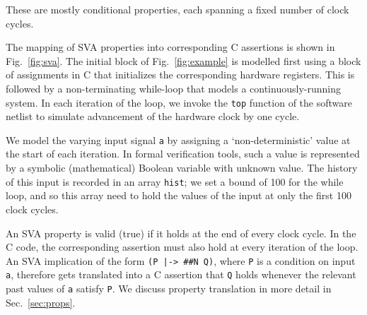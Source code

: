 \noindent These are mostly conditional properties, each spanning a fixed number of clock cycles. 
 
The mapping of SVA properties into corresponding C assertions is shown in Fig.\ \ref{fig:sva}. The initial block of Fig.\ \ref{fig:example} is modelled first using a block of assignments in C that initializes the corresponding hardware registers.  This is followed by a non-terminating while-loop that models a continuously-running system. In each iteration of the loop, we invoke the \texttt{top} function of the software netlist to simulate advancement of the hardware clock by one cycle. 

We model the varying input signal \texttt{a} by assigning a `non-deterministic' value at the start of each iteration. In formal verification tools, such a value is represented by a symbolic (mathematical) Boolean variable with unknown value. The history of this input is recorded in an array \texttt{hist}; we set a bound of 100 for the while loop, and so this array need to hold the values of the input at only the first 100 clock cycles.

An SVA property is valid (true) if it holds at the end of every clock cycle. In the C code, the corresponding assertion must also hold at every iteration of the loop. An SVA implication of the form \texttt{(P |-> \#\#N Q)}, where \texttt{P} is a condition on input \texttt{a}, therefore gets translated into a C assertion that \texttt{Q} holds whenever the relevant past values of \texttt{a} satisfy \texttt{P}. We discuss property translation in more detail in Sec.\ \ref{sec:props}.

